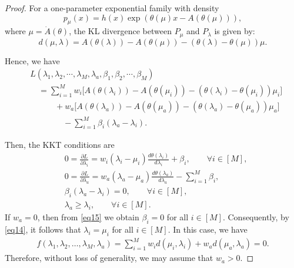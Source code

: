 \documentclass[final]{IEEEtran}
\newcommand{\nn}{\nonumber}
\begin{document}
\begin{proof}
For a one-parameter exponential family with density
\[
p_\mu(x) = h(x) \exp\left( \theta(\mu)x - A(\theta(\mu)) \right),
\]
where $\mu = \dot{A}(\theta)$, the KL divergence between $P_\mu$ and $P_\lambda$ is given by:
\[
d(\mu, \lambda) = A(\theta(\lambda)) - A(\theta(\mu)) - (\theta(\lambda) - \theta(\mu)) \mu.
\]

Hence, we have
\begin{align}
&L(\lambda_1,\lambda_2,\cdots,\lambda_M,\lambda_a, \beta_1,\beta_2, \cdots, \beta_M)\nn\\
&\quad =\sum_{i=1}^M w_i \big[A(\theta(\lambda_i)) - A(\theta(\mu_i)) - (\theta(\lambda_i) - \theta(\mu_i)) \mu_i\big]\nn\\
&\quad \qquad +w_a \big[A(\theta(\lambda_a)) - A(\theta(\mu_a)) - (\theta(\lambda_a) - \theta(\mu_a)) \mu_a\big]\nn\\
&\qquad \qquad - \sum_{i=1}^M \beta_i (\lambda_a-\lambda_i). 
\end{align}


Then, the KKT conditions are
\begin{align}
&0=\frac{\partial L}{\partial \lambda_i}=w_i (\lambda_i-\mu_i)\frac{d\theta(\lambda_i)}{d\lambda_i}+\beta_i, \qquad \forall i \in [M], \label{eq14}\\
&0=\frac{\partial L}{\partial \lambda_a}=w_a (\lambda_a-\mu_a) \frac{d\theta(\lambda_a)}{d\lambda_a}-\sum_{i=1}^M \beta_i, \label{eq15}\\
&\beta_i(\lambda_a-\lambda_i)=0, \qquad \forall i \in [M], \label{eq16}\\
&\lambda_a \geq \lambda_i, \qquad \forall i \in [M] \label{eq17}. 
\end{align}
If $w_a = 0$, then from \eqref{eq15} we obtain $\beta_i = 0$ for all $i \in [M]$. Consequently, by \eqref{eq14}, it follows that $\lambda_i = \mu_i$ for all $i \in [M]$. In this case, we have
\begin{align}
f(\lambda_1, \lambda_2, \ldots, \lambda_M, \lambda_a)
= \sum_{i=1}^M w_i d(\mu_i, \lambda_i) + w_a d(\mu_a, \lambda_a)
= 0.
\end{align}
Therefore, without loss of generality, we may assume that $w_a > 0$.


\end{proof}
\end{document}

